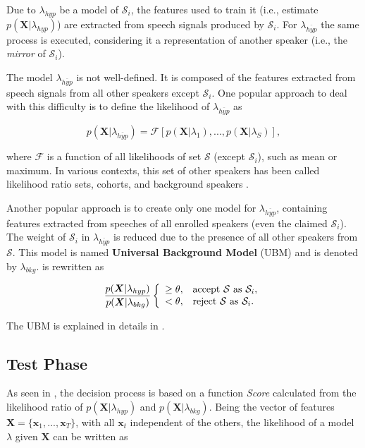 \noindent Due to $\lambda_{hyp}$ be a model of $\mathcal{S}_i$, the features used to train it (i.e., estimate $p(\boldsymbol{X}|\lambda_{hyp})$) are extracted from speech signals produced by $\mathcal{S}_i$. For $\lambda_{\overline{hyp}}$ the same process is executed, considering it a representation of another speaker (i.e., the \emph{mirror} of $\mathcal{S}_i$).

The model $\lambda_{\overline{hyp}}$ is not well-defined. It is composed of the features extracted from speech signals from all other speakers except $\mathcal{S}_i$. One popular approach to deal with this difficulty is to define the likelihood of $\lambda_{\overline{hyp}}$ as

\begin{equation}
    p(\boldsymbol{X}|\lambda_{\overline{hyp}}) = \mathcal{F}[p(\boldsymbol{X}|\lambda_1), ..., p(\boldsymbol{X}|\lambda_S)],
    \label{eq:log-likelihood-ratio}
\end{equation}

\noindent where $\mathcal{F}$ is a function of all likelihoods of set $\boldsymbol{\mathcal{S}}$ (except $\mathcal{S}_i$), such as mean or maximum. In various contexts, this set of other speakers has been called likelihood ratio sets, cohorts, and background speakers .

Another popular approach is to create only one model for $\lambda_{\overline{hyp}}$, containing features extracted from speeches of all enrolled speakers (even the claimed $\mathcal{S}_i$). The weight of $\mathcal{S}_i$ in $\lambda_{\overline{hyp}}$ is reduced due to the presence of all other speakers from $\boldsymbol{\mathcal{S}}$. This model is named \textbf{Universal Background Model} (UBM) and is denoted by $\lambda_{bkg}$.  is rewritten as

\begin{equation}
    \frac{p(\boldsymbol{X}|\lambda_{hyp})}{p(\boldsymbol{X}|\lambda_{bkg})} \verifytest{\theta}{\mathcal{S} \text{ as } \mathcal{S}_i}
    \label{eq:likelihood-ratio-test-4}
\end{equation}

\noindent The UBM is explained in details in .

\subsection{Test Phase}

As seen in , the decision process is based on a function \emph{Score} calculated from the likelihood ratio of $p(\boldsymbol{X}|\lambda_{hyp})$ and $p(\boldsymbol{X}|\lambda_{bkg})$. Being the vector of features $\boldsymbol{X} = \{\boldsymbol{x}_1, ..., \boldsymbol{x}_T\}$, with all $\boldsymbol{x}_t$ independent of the others, the likelihood of a model $\lambda$ given $\boldsymbol{X}$ can be written as

